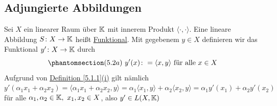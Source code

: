 \subsection{Adjungierte Abbildungen}
Sei $X$ ein linearer Raum über $\mathbb{K}$ mit innerem Produkt $\langle \cdot ,\cdot\rangle$.  Eine lineare Abbildung $S\colon X\rightarrow \mathbb{K}$ heißt \underline{Funktional}.  Mit gegebenem $y\in X$ definieren wir das Funktional $y'\colon X\rightarrow \mathbb{K}$ durch
\[\phantomsection\label{5.2a}(5.2a)\ y'(x)\colon =\langle x,y\rangle\text{ für alle } x\in X\]
Aufgrund von \hyperref[5.1.1]{Definition \ref{5.1.1}(i)} gilt nämlich $y'(\alpha _1x_1+\alpha _2x_2)=\langle \alpha _1x_1+\alpha _2x_2,y\rangle = \alpha _1\langle x_1,y\rangle +\alpha _2\langle x_2,y\rangle = \alpha _1 y'(x_1)+\alpha _2 y'(x_2)$ für alle $\alpha _1,\alpha _2\in \K ,\ x_1,x_2\in X$, also $y'\in L(X,\mathbb{K})$
